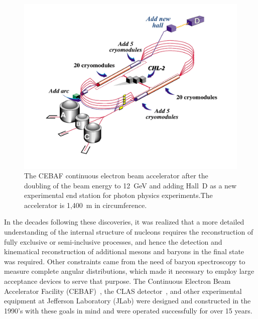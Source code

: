 \documentclass[final,3p,twocolumn]{elsarticle}
\begin{document}
\begin{figure}[ht]
\centerline{\includegraphics[width=1.0\columnwidth]{cebaf.pdf}}
\caption{The CEBAF continuous electron beam accelerator after the doubling of the beam energy to 12~GeV and 
adding Hall~D as a new experimental end station for photon physics experiments.The accelerator is 1,400~m in
circumference.}
\label{cebaf12}
\end{figure} 

In the decades following these discoveries, it was realized that a more detailed understanding of the internal
structure of nucleons requires the reconstruction of fully exclusive or semi-inclusive processes, and hence the
detection and kinematical reconstruction of additional mesons and baryons in the final state was required.  Other
constraints came from the need of baryon spectroscopy to measure complete angular distributions, which made it
necessary to employ large acceptance devices to serve that purpose. The Continuous Electron Beam Accelerator
Facility (CEBAF)~\cite{Leemann:2001dg}, the CLAS detector~\cite{Mecking:2003zu}, and other experimental
equipment at Jefferson Laboratory (JLab) were designed and constructed in the 1990's with these goals in mind
and were operated successfully for over 15 years. 
\end{document}
